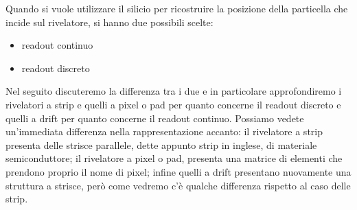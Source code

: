 \begin{minipage}{0.6\textwidth}
   Quando si vuole utilizzare il silicio per ricostruire la posizione della particella che incide sul rivelatore, si hanno due possibili scelte:
   \begin{itemize}
      \item readout continuo
      \item readout discreto
   \end{itemize}
   Nel seguito discuteremo la differenza tra i due e in particolare approfondiremo i rivelatori a strip e quelli a pixel o pad per quanto concerne il readout discreto e quelli a drift per quanto concerne il readout continuo. Possiamo vedete un'immediata differenza nella rappresentazione accanto: il rivelatore a strip presenta delle strisce parallele, dette appunto strip in inglese, di materiale semiconduttore; il rivelatore a pixel o pad, presenta una matrice di elementi che prendono proprio il nome di pixel; infine quelli a drift presentano nuovamente una struttura a strisce, però come vedremo c'è qualche differenza rispetto al caso delle strip.
\end{minipage}

